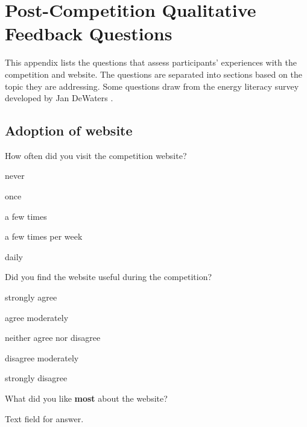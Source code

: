 \chapter{Post-Competition Qualitative Feedback Questions}
\label{app:qualitative-feedback}

This appendix lists the questions that assess participants' experiences with the competition and website. The questions are separated into sections based on the topic they are addressing. Some questions draw from the energy literacy survey developed by Jan DeWaters \cite{DeWaters2009Survey}.

\section{Adoption of website}

\begin{question}[start=1]
	\item How often did you visit the competition website?
\end{question}

\begin{answer}
	\item never
	\item once
	\item a few times
	\item a few times per week
	\item daily
\end{answer}

\begin{question}
	\item Did you find the website useful during the competition?
\end{question}

\begin{answer}
	\item strongly agree
	\item agree moderately
	\item neither agree nor disagree
	\item disagree moderately
	\item strongly disagree
\end{answer}

\begin{question}
	\item What did you like \textbf{most} about the website?
\end{question}

Text field for answer.

